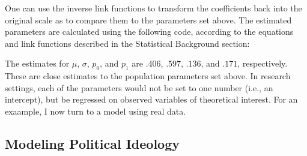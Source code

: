 \documentclass[english,,man]{apa6}
\newenvironment{Shaded}{\begin{snugshade}}{\end{snugshade}}
\newcommand{\CommentTok}[1]{\textcolor[rgb]{0.56,0.35,0.01}{\textit{#1}}}
\newcommand{\ControlFlowTok}[1]{\textcolor[rgb]{0.13,0.29,0.53}{\textbf{#1}}}
\newcommand{\DecValTok}[1]{\textcolor[rgb]{0.00,0.00,0.81}{#1}}
\newcommand{\KeywordTok}[1]{\textcolor[rgb]{0.13,0.29,0.53}{\textbf{#1}}}
\newcommand{\NormalTok}[1]{#1}
\newcommand{\OperatorTok}[1]{\textcolor[rgb]{0.81,0.36,0.00}{\textbf{#1}}}
\newcommand{\StringTok}[1]{\textcolor[rgb]{0.31,0.60,0.02}{#1}}
\begin{document}
One can use the inverse link functions to transform the coefficients back into the original scale as to compare them to the parameters set above. The estimated parameters are calculated using the following code, according to the equations and link functions described in the Statistical Background section:

\begin{Shaded}
\end{Shaded}

The estimates for \(\mu\), \(\sigma\), \(p_0\), and \(p_1\) are \(.406\), \(.597\), \(.136\), and \(.171\), respectively. These are close estimates to the population parameters set above. In research settings, each of the parameters would not be set to one number (i.e., an intercept), but be regressed on observed variables of theoretical interest. For an exaample, I now turn to a model using real data.

\hypertarget{modeling-political-ideology}{%
\subsection{Modeling Political Ideology}\label{modeling-political-ideology}}
\end{document}
